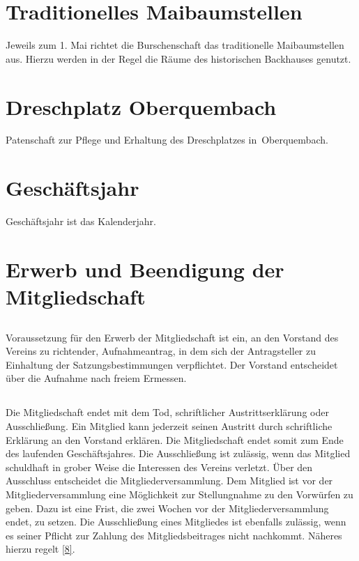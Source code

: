 \section{Traditionelles Maibaumstellen}
Jeweils zum 1. Mai richtet die Burschenschaft das traditionelle Maibaumstellen aus. Hierzu werden in der Regel die Räume des historischen Backhauses genutzt.

\section{Dreschplatz Oberquembach}
Patenschaft zur Pflege und Erhaltung des Dreschplatzes in Oberquembach.

\section{Geschäftsjahr}
Geschäftsjahr ist das Kalenderjahr.

\section{Erwerb und Beendigung der Mitgliedschaft}
	\subsection{} Voraussetzung für den Erwerb der Mitgliedschaft ist ein, an den Vorstand des Vereins zu richtender, Aufnahmeantrag, in dem sich der Antragsteller zu Einhaltung der Satzungsbestimmungen verpflichtet. Der Vorstand entscheidet über die Aufnahme nach freiem Ermessen.
	
	\subsection{} Die Mitgliedschaft endet mit dem Tod, schriftlicher Austrittserklärung oder Ausschließung. Ein Mitglied kann jederzeit seinen Austritt durch schriftliche Erklärung an den Vorstand erklären. Die Mitgliedschaft endet somit zum Ende des laufenden Geschäftsjahres. 
	Die Ausschließung ist zulässig, wenn das Mitglied schuldhaft in grober Weise die Interessen des Vereins verletzt. Über den Ausschluss entscheidet die Mitgliederversammlung. Dem Mitglied ist vor der Mitgliederversammlung eine Möglichkeit zur Stellungnahme zu den Vorwürfen zu geben. Dazu ist eine Frist, die zwei Wochen vor der Mitgliederversammlung endet, zu setzen. Die Ausschließung eines Mitgliedes ist ebenfalls zulässig, wenn es seiner Pflicht zur Zahlung des Mitgliedsbeitrages nicht nachkommt. Näheres hierzu regelt \ref{8}.
	
